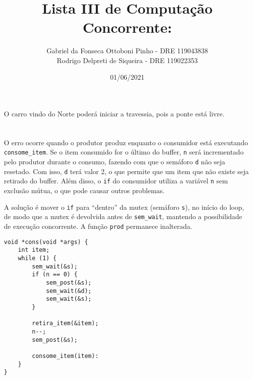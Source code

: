 \documentclass[12pt]{article}
\title{Lista III de Computação Concorrente:}
\author{Gabriel da Fonseca Ottoboni Pinho - DRE 119043838\\
	Rodrigo Delpreti de Siqueira - DRE 119022353}
\date{01/06/2021}
\begin{document}
\maketitle

\section{}
O carro vindo do Norte poderá iniciar a travessia,
pois a ponte está livre.
	
\newpage
\section{}
O erro ocorre quando o
produtor produz enquanto o
consumidor está executando \texttt{consome\_item}.
Se o item consumido for o último do buffer,
\texttt{n} será incrementado pelo produtor
durante o consumo,
fazendo com que o semáforo \texttt{d}
não seja resetado.
Com isso,
\texttt{d} terá valor 2,
o que permite que um
item que não existe seja
retirado do buffer.
Além disso,
o \texttt{if} do consumidor
utiliza a variável \texttt{n}
sem exclusão mútua,
o que pode causar outros problemas.

A solução é
mover o \texttt{if} para
``dentro'' da mutex (semáforo \texttt{s}),
no início do loop,
de modo que a mutex é
devolvida antes de \texttt{sem\_wait},
mantendo a possibilidade de
execução concorrente.
A função \texttt{prod}
permanece inalterada.
\begin{verbatim}
void *cons(void *args) {
	int item;
	while (1) {
		sem_wait(&s);
		if (n == 0) {
			sem_post(&s);
			sem_wait(&d);
			sem_wait(&s);
		}

		retira_item(&item);
		n--;
		sem_post(&s);

		consome_item(item):
	}
}
\end{verbatim}
\end{document}

